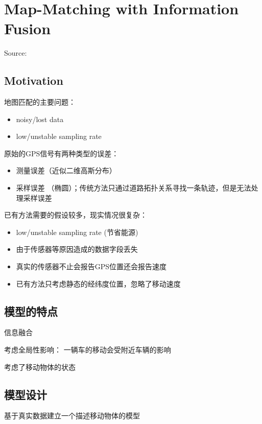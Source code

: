 \chapter{Map-Matching with Information Fusion}

Source: \cite{Hu2017a}

\section{Motivation}

地图匹配的主要问题：

\begin{itemize}
    \item noisy/lost data
    \item low/unstable sampling rate
\end{itemize}

原始的GPS信号有两种类型的误差：

\begin{itemize}
    \item 测量误差（近似二维高斯分布）
    \item 采样误差 （椭圆）；传统方法只通过道路拓扑关系寻找一条轨迹，但是无法处理采样误差
\end{itemize}

已有方法需要的假设较多，现实情况很复杂：

\begin{itemize}
    \item low/unstable sampling rate (节省能源)
    \item 由于传感器等原因造成的数据字段丢失
    \item 真实的传感器不止会报告GPS位置还会报告速度
    \item 已有方法只考虑静态的经纬度位置，忽略了移动速度
\end{itemize}

\section{模型的特点}

信息融合

考虑全局性影响： 一辆车的移动会受附近车辆的影响

考虑了移动物体的状态

\section{模型设计}

基于真实数据建立一个描述移动物体的模型


